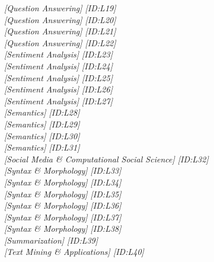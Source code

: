 \hfill \textit{[Question Answering]  [ID:L19]} \\ 
\hfill \textit{[Question Answering]  [ID:L20]} \\ 
\hfill \textit{[Question Answering]  [ID:L21]} \\ 
\hfill \textit{[Question Answering]  [ID:L22]} \\ 
\hfill \textit{[Sentiment Analysis]  [ID:L23]} \\ 
\hfill \textit{[Sentiment Analysis]  [ID:L24]} \\ 
\hfill \textit{[Sentiment Analysis]  [ID:L25]} \\ 
\hfill \textit{[Sentiment Analysis]  [ID:L26]} \\ 
\hfill \textit{[Sentiment Analysis]  [ID:L27]} \\ 
\hfill \textit{[Semantics]  [ID:L28]} \\ 
\hfill \textit{[Semantics]  [ID:L29]} \\ 
\hfill \textit{[Semantics]  [ID:L30]} \\ 
\hfill \textit{[Semantics]  [ID:L31]} \\ 
\hfill \textit{[Social Media \& Computational Social Science]  [ID:L32]} \\ 
\hfill \textit{[Syntax \& Morphology]  [ID:L33]} \\ 
\hfill \textit{[Syntax \& Morphology]  [ID:L34]} \\ 
\hfill \textit{[Syntax \& Morphology]  [ID:L35]} \\ 
\hfill \textit{[Syntax \& Morphology]  [ID:L36]} \\ 
\hfill \textit{[Syntax \& Morphology]  [ID:L37]} \\ 
\hfill \textit{[Syntax \& Morphology]  [ID:L38]} \\ 
\hfill \textit{[Summarization]  [ID:L39]} \\ 
\hfill \textit{[Text Mining \& Applications]  [ID:L40]} \\ 

